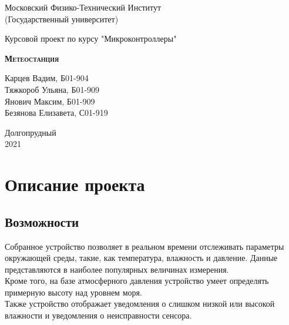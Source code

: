 \documentclass[12pt]{article}
\begin{document}
  \begin{titlepage}
    \newpage

    \begin{center}
      Московский Физико-Технический Институт\\
      (Государственный университет)
    \end{center}

    \vspace{8em}

    \begin{center}
      \large Курсовой проект по курсу "Микроконтроллеры"\\
    \end{center}


    \begin{center}
      \Large \textsc{\textbf{Метеостанция}}
    \end{center}

    \vspace{6em}

    \begin{center}
      Карцев Вадим, Б01-904\\
      Тяжкороб Ульяна, Б01-909\\
      Янович Максим, Б01-909\\
      Безянова Елизавета, С01-919
    \end{center}


    \vspace{\fill}

    \begin{center}
      Долгопрудный\\
      2021
    \end{center}

  \end{titlepage}



  \section{Описание проекта}

    \subsection{Возможности}
      Собранное устройство позволяет в реальном времени отслеживать параметры
      окружающей среды, такие, как температура, влажность и давление.
      Данные представляются в наиболее популярных величинах измерения.\\
      Кроме того, на базе атмосферного давления устройство умеет определять
      примерную высоту над уровнем моря.\\
      Также устройство отображает уведомления о слишком низкой или высокой
      влажности и уведомления о неисправности сенсора.
\end{document}
